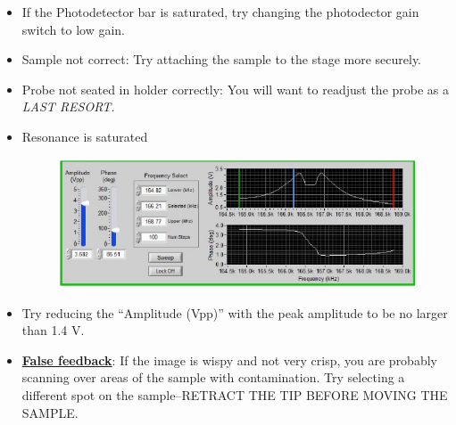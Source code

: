 \documentclass{../lab}
\begin{document}
\begin{itemize}
    \item If the Photodetector bar is saturated, try changing the photodector gain switch to low gain.

    \item Sample not correct:  Try attaching the sample to the stage more securely.

    \item Probe not seated in holder correctly:  You will want to readjust the probe as a \emph{LAST RESORT.}

    \item Resonance is saturated

    \begin{figure}[H]
        \centering
        \href{http://experimentationlab.berkeley.edu/sites/default/files/AFMImages/54.png}{\includegraphics[width=0.7\linewidth]{images/54.png}}
        \caption{}
    \end{figure}

    \item Try reducing the ``Amplitude (Vpp)'' with the peak amplitude to be no larger than 1.4 V.

    \item \href{http://experimentationlab.berkeley.edu/sites/default/files/AFMImages/VM\%204.2.\%20On\%20Cont-small\%20vib\_converted\_r1.mp4}{\textbf{False feedback}}:  If the image is wispy and not very crisp, you are probably scanning over areas of the sample with contamination.  Try selecting a different spot on the sample--RETRACT THE TIP BEFORE MOVING THE SAMPLE.
\end{itemize}
\end{document}

